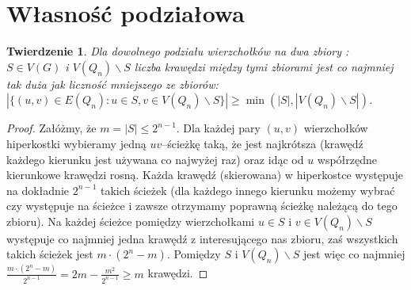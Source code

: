 \documentclass{pracamgr}
\newtheorem{theorem}{Twierdzenie}[chapter]
\begin{document}
  \section{Własność podziałowa}
   \begin{theorem}\label{wlasnosc podzialowa}
    Dla dowolnego podziału wierzchołków na dwa zbiory : $S\in V(G)$ i $V(Q_n)\backslash S$
    liczba krawędzi między tymi zbiorami jest co najmniej tak duża jak liczność mniejszego ze zbiorów:
    $|\{(u,v)\in E(Q_n):u\in S,v\in V(Q_n)\backslash S\}|\ge\min(|S|,|V(Q_n)\backslash S|)$.
   \end{theorem}
   \begin{proof}
    Załóżmy, że $m=|S|\le 2^{n-1}$.\newline
    Dla każdej pary $(u,v)$ wierzchołków hiperkostki wybieramy jedną $uv$--ścieżkę taką, że jest najkrótsza
    (krawędź każdego kierunku jest używana co najwyżej raz) oraz idąc od $u$ współrzędne kierunkowe krawędzi rosną.
    Każda krawędź (skierowana) w hiperkostce występuje na dokładnie $2^{n-1}$ takich ścieżek
    (dla każdego innego kierunku możemy wybrać czy występuje na ścieżce i zawsze otrzymamy poprawną ścieżkę należącą do tego zbioru).
    Na każdej ścieżce pomiędzy wierzchołkami $u\in S$ i $v\in V(Q_n)\backslash S$ występuje co najmniej jedna krawędź z interesującego nas zbioru,
    zaś wszystkich takich ścieżek jest $m\cdot(2^n-m)$. Pomiędzy $S$ i $V(Q_n)\backslash S$ jest więc co najmniej
    $\frac{m\cdot(2^n-m)}{2^{n-1}}=2m-\frac{m^2}{2^{n-1}}\ge m$ krawędzi. 
   \end{proof}
\end{document}
